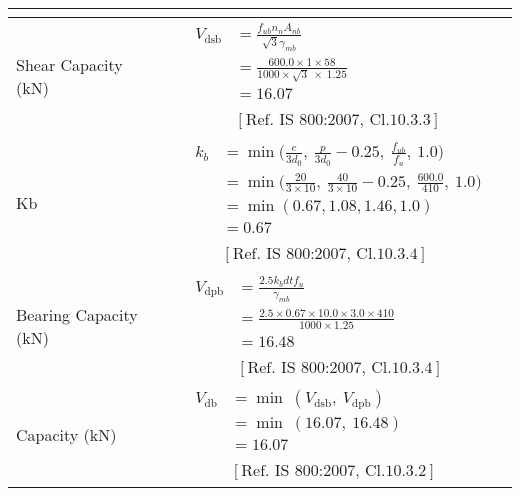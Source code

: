 \documentclass{article}%
\begin{document}
\begin{longtable}{|p{3.5cm}|p{5.3cm}|p{6.7cm}|p{1.5cm}|}
{\textbf{}
}\\%
\hline%
Shear Capacity (kN)&&$\begin{aligned}V_{\text{dsb}} &= \frac{f_{ub} n_n A_{nb}}{\sqrt{3} \gamma_{mb}}\\ &= \frac{600.0\times1\times58}{1000\times\sqrt{3}~\times~1.25}\\ &= 16.07\\ \\ & [\text{Ref. IS 800:2007, Cl.10.3.3}] \end{aligned}$&\textcolor{OsdagGreen}{ 
\textbf{}
}\\%
\hline%
Kb& &$\begin{aligned} k_b & = \min \Bigg(\frac{e}{3d_0},~\frac{p}{3d_0}-0.25,~\frac{f_{ub}}{f_u},~1.0 \Bigg) \\ & = \min \Bigg(\frac{20}{3\times10},~\frac{40}{3\times10}-0.25,~\frac{600.0}{410},~1.0 \Bigg)\\ & = \min(0.67,1.08,1.46,1.0)\\ & = 0.67\\ \\ & [\text{Ref. IS 800:2007, Cl.10.3.4}] \end{aligned}$&\textcolor{OsdagGreen}{ 
\textbf{}
}\\%
\hline%
Bearing Capacity (kN)&&$\begin{aligned}V_{\text{dpb}} &= \frac{2.5 k_b d t f_u}{\gamma_{mb}}\\ &= \frac{2.5 \times 0.67\times10.0\times3.0\times410}{1000\times1.25}\\ &=16.48\\ \\ & [\text{Ref. IS 800:2007, Cl.10.3.4}] \end{aligned}$&\textcolor{OsdagGreen}{ 
\textbf{}
}\\%
\hline%
Capacity (kN)&&$\begin{aligned} V_{\text{db}} &= \min~ (V_{\text{dsb}},~ V_{\text{dpb}})\\ &= \min~ (16.07,~16.48)\\ &=16.07\\ \\ & [\text{Ref. IS 800:2007, Cl.10.3.2}] \end{aligned}$&\textcolor{OsdagGreen}{ 
\textbf{}
}\\%
\hline%

\end{longtable}
\end{document}
